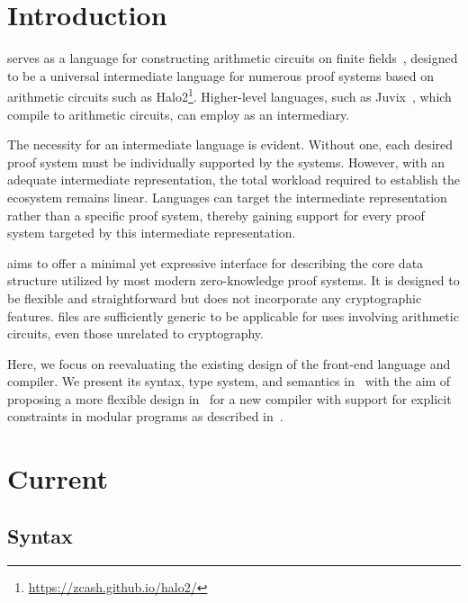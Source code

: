 \documentclass[
    9pt,            
    techreport,       
    affiltop,       
]{art}
\begin{document}
\maketitle
\tableofcontents

\section{Introduction}

\VampIR{} serves as a language for constructing arithmetic circuits on finite fields~\citep{anoma-vampir,vamp-ir-book}, designed to be a universal intermediate language for numerous proof systems based on arithmetic circuits such as Halo2\footnote{\url{https://zcash.github.io/halo2/}}. Higher-level languages, such as Juvix~\citep{anoma-juvix}, which compile to arithmetic circuits, can employ \VampIR{} as an intermediary.

The necessity for an intermediate language is evident. Without one, each desired proof system must be individually supported by the systems. However, with an adequate intermediate representation, the total workload required to establish the ecosystem remains linear. Languages can target the intermediate representation rather than a specific proof system, thereby gaining support for every proof system targeted by this intermediate representation.

\VampIR{} aims to offer a minimal yet expressive interface for describing the core data structure utilized by most modern zero-knowledge proof systems. It is designed to be flexible and straightforward but does not incorporate any cryptographic features. \VampIR{} files are sufficiently generic to be applicable for uses involving arithmetic circuits, even those unrelated to cryptography.

Here, we focus on reevaluating the existing design of the \VampIR{} front-end language and compiler. We present its syntax, type system, and semantics in~ with the aim of proposing a more flexible design in~ for a new compiler with support for explicit constraints in modular \VampIR{} programs as described in~. 

\section{Current \VampIR{}}\label{sec:current-vampIR}


\subsection{Syntax}\label{sec:syntax}
\end{document}
